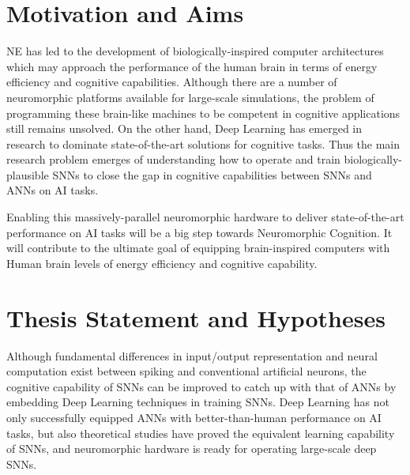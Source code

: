\section{Motivation and Aims}
\label{sec:state_problem}
NE has led to the development of biologically-inspired computer architectures which may approach the performance of the human brain in terms of energy efficiency and cognitive capabilities.
Although there are a number of neuromorphic platforms available for large-scale \DIFdelbegin {}\DIFdelend \DIFaddbegin {}\DIFaddend simulations, the problem of programming these brain-like machines to be competent in cognitive applications still remains unsolved.
On the other hand, Deep Learning has emerged in \DIFdelbegin {}\DIFdelend \DIFaddbegin {}\DIFaddend research to dominate state-of-the-art solutions for cognitive tasks.
Thus the main research problem emerges of understanding how to operate and train biologically-plausible SNNs to close the gap in cognitive capabilities between SNNs and ANNs on AI tasks.


Enabling this massively-parallel neuromorphic hardware to deliver state-of-the-art performance on AI tasks will be a big step towards Neuromorphic Cognition.
It will contribute to the ultimate goal of equipping brain-inspired computers with Human brain levels of energy efficiency and cognitive capability. 


\section{Thesis Statement and Hypotheses}
\label{sec:aim}
Although fundamental differences in input/output representation and neural computation exist between spiking and conventional artificial neurons, the cognitive capability of SNNs can be improved to catch up with that of ANNs by embedding Deep Learning techniques in training SNNs.
Deep Learning has not only successfully equipped ANNs with better-than-human performance on AI tasks, but also theoretical studies have proved the equivalent learning capability of SNNs, and neuromorphic hardware is ready for operating large-scale deep SNNs.

